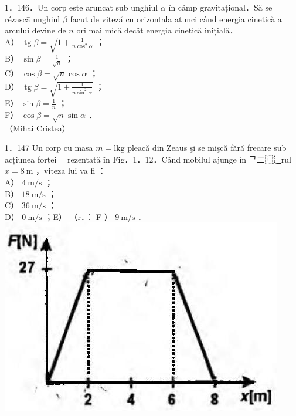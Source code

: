 \documentclass[10pt]{article}
\begin{document}
1．146．Un corp este aruncat sub unghiul $\alpha$ în câmp gravitațional．Să se rézascā unghiul $\beta$ facut de viteză cu orizontala atunci când energia cinetică a arcului devine de $n$ ori mai mică decât energia cinetică inițială．\\
A） $\operatorname{tg} \beta=\sqrt{1+\frac{1}{n \cos ^{2} \alpha}}$ ；\\
B） $\sin \beta=\frac{1}{\sqrt{n}}$ ；\\
C） $\cos \beta=\sqrt{n} \cos \alpha$ ；\\
D） $\operatorname{tg} \beta=\sqrt{1+\frac{1}{n \sin ^{2} \alpha}}$ ；\\
E） $\sin \beta=\frac{1}{n}$ ；\\
F） $\cos \beta=\sqrt{n} \sin \alpha$ ．\\
（Mihai Cristea）

1．147 Un corp cu masa $m=\mathrm{lkg}$ pleacă din Zeaus şi se mişcă fără frecare sub acțiunea forței －rezentată în Fig．1．12．Când mobilul ajunge în ᄀ二⿺辶rul $x=8 \mathrm{~m}$ ，viteza lui va fi ：\\
A） $4 \mathrm{~m} / \mathrm{s}$ ；\\
B） $18 \mathrm{~m} / \mathrm{s}$ ；\\
C） $36 \mathrm{~m} / \mathrm{s}$ ；\\
D） $0 \mathrm{~m} / \mathrm{s}$ ；E） （r．： F ） $9 \mathrm{~m} / \mathrm{s}$ ．\\
\includegraphics[max width=\textwidth, center]{2025_07_01_5b3ff9fa0d508c8e9f17g-035}
\end{document}
